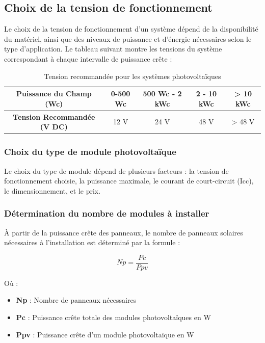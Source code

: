 \subsection{Choix de la tension de fonctionnement}

Le choix de la tension de fonctionnement d'un système dépend de la disponibilité du matériel, ainsi que des niveaux de puissance et d'énergie nécessaires selon le type d'application. Le tableau suivant montre les tensions du système correspondant à chaque intervalle de puissance crête :

\begin{table}[H]
	\centering
	\begin{tabular}{|c|c|c|c|c|}
		\hline
			\rule[0.5cm]{0cm}{0cm}\textbf{Puissance du Champ (Wc)} & 0-500 Wc & 500 Wc - 2 kWc  & 2 - 10 kWc & 	> 10 kWc \\
		\hline
			\rule[0.5cm]{0cm}{0cm}\textbf{Tension Recommandée (V DC)} & 12 V  & 24 V & 48 V & > 48 V \\
		\hline
	\end{tabular}
\caption{Tension recommandée pour les systèmes photovoltaïques}
\end{table}

\subsubsection{Choix du type de module photovoltaïque}

Le choix du type de module dépend de plusieurs facteurs : la tension de fonctionnement choisie, la puissance maximale, le courant de court-circuit (Icc), le dimensionnement, et le prix.

\subsubsection{Détermination du nombre de modules à installer}

À partir de la puissance crête des panneaux, le nombre de panneaux solaires nécessaires à l'installation est déterminé par la formule :

\begin{equation}
Np = \frac{Pc}{Ppv}
\end{equation}


Où :

\begin{itemize}
	\item \textbf{Np} : Nombre de panneaux nécessaires
	\item \textbf{Pc} : Puissance crête totale des modules photovoltaïques en W
	\item \textbf{Ppv} : Puissance crête d’un module photovoltaïque en W
\end{itemize}

